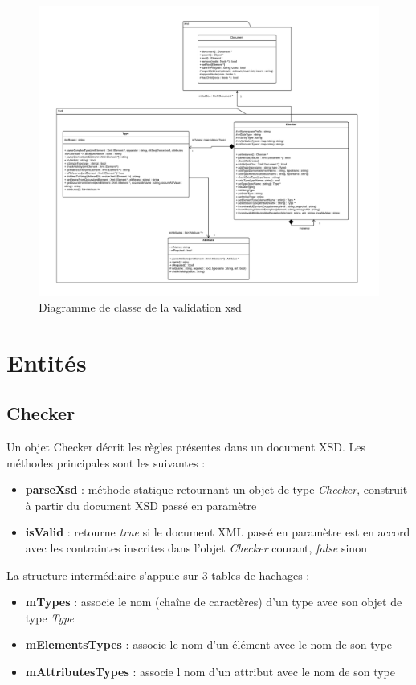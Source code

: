 \begin{landscape}
\begin{figure}[H]
	\centering
	\includegraphics[width=\linewidth]{images/xsd-uml.pdf}
	\caption{Diagramme de classe de la validation xsd}
	\label{xsdClassDiagram}
\end{figure}
\end{landscape}

\section{Entités}
	\subsection{Checker}
		Un objet Checker décrit les règles présentes dans un document XSD. Les méthodes principales sont les suivantes :
		\begin{itemize}
			\item \textbf{parseXsd} : méthode statique retournant un objet de type \textit{Checker},  construit à partir du document XSD passé en paramètre
			\item \textbf{isValid} : retourne \textit{true} si le document XML passé en paramètre est en accord avec les contraintes inscrites dans l'objet \textit{Checker} courant, \textit{false} sinon
		\end{itemize}

		La structure intermédiaire s'appuie sur 3 tables de hachages :
		\begin{itemize}
			\item \textbf{mTypes} : associe le nom (chaîne de caractères) d'un type avec son objet de type \textit{Type}
			\item \textbf{mElementsTypes} : associe le nom d'un élément avec le nom de son type
			\item \textbf{mAttributesTypes} : associe l nom d'un attribut avec le nom de son type
		\end{itemize}

